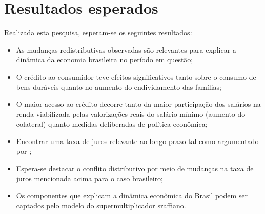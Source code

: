 \section{Resultados esperados}\label{Result}
Realizada esta pesquisa, esperam-se os seguintes resultados:
\begin{itemize}
	\item As mudanças redistributivas observadas são relevantes para explicar a dinâmica da economia brasileira no período em questão;
	\item O crédito ao consumidor teve efeitos significativos tanto sobre o consumo de bens duráveis quanto no aumento do endividamento das famílias;
	\item O maior acesso ao crédito decorre tanto da maior participação dos salários na renda viabilizada pelas valorizações reais do salário mínimo (aumento do colateral) quanto medidas deliberadas de política econômica;
	\item Encontrar uma taxa de juros relevante ao longo prazo tal como argumentado por \textcite{pivetti_essay_1992};
	\item Espera-se destacar o conflito distributivo por meio de mudanças na taxa de juros mencionada acima para o caso brasileiro;
	\item Os componentes que explicam a dinâmica econômica do Brasil podem ser captados pelo modelo do supermultiplicador sraffiano.
\end{itemize}
